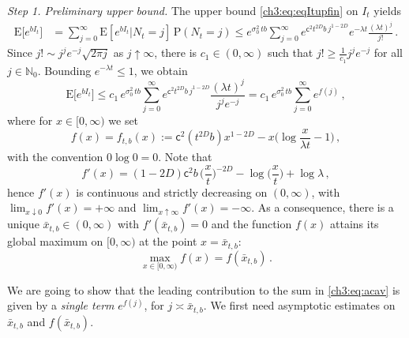 \documentclass[a4paper,reqno,11pt]{amsart}
\numberwithin{equation}{section}
\newcommand{\N}{\mathbb{N}}
\newcommand{\PEfont}{\mathrm}
\renewcommand{\P}{\ensuremath{\PEfont P}}
\newcommand{\E}{\ensuremath{\PEfont E}}
\newcommand\sfc{\mathsf{c}}
\begin{document}
\medskip
\noindent
\emph{Step 1. Preliminary upper bound.}
The upper bound \eqref{ch3:eq:eqItupfin} on $I_t$ yields
\begin{equation*}
\begin{split}
 \E\big[e^{bI_t}\big] &= 
 \sum_{j=0}^{\infty}
 \E[e^{bI_t}|N_t=j ] \, \P (N_t=j) \le
e^{\sigma_0^2 \, t b} \sum_{j=0}^{\infty} 
e^{\sfc^2 t^{2D} b \, j^{1-2D}}
 e^{-\lambda t}\frac{(\lambda t)^j}{j!} \,.
\end{split}
\end{equation*}
Since $j! \sim j^j e^{-j} \sqrt{2\pi j}$ as $j\uparrow \infty$,
there is $c_1 \in (0,\infty)$ such that $j! \ge \frac{1}{c_1}
j^j e^{-j}$ for all $j\in\N_0$. Bounding $e^{-\lambda t} \le 1$, we obtain
\begin{equation}\label{ch3:eq:acav}
	\E\big[e^{bI_t}\big] \le
	c_1 \, e^{\sigma_0^2 \, t b} \sum_{j=0}^{\infty} 
	e^{\sfc^2 t^{2D} b \, j^{1-2D}}
	\frac{(\lambda t)^j}{j^j e^{-j}} 
	= c_1 \, e^{\sigma_0^2 \, t b} \sum_{j=0}^{\infty} 
	e^{f(j)} \,,
\end{equation}
where for $x \in [0,\infty)$ we set
\begin{equation}\label{ch3:eq: eqdefnf}
	f(x)= f_{t,b}(x) := \sfc^2 \left(t^{2D}b\right) x^{1-2D} - x \bigg( \log \frac{x}{\lambda t} - 1 \bigg) \,,
\end{equation}
with the convention $0\log 0=0$. Note that
\begin{equation} \label{ch3:eq:f'}
	f'(x) = (1-2D) \sfc^2 b \, \bigg( \frac{x}{t} \bigg)^{-2D} 
	- \log \bigg(\frac{x}{t}\bigg) + \log \lambda \,,
\end{equation}
hence $f'(x)$ is continuous and strictly decreasing on $(0,\infty)$, with 
$\lim_{x \downarrow 0} f'(x) = +\infty$ and
$\lim_{x \uparrow \infty }f'(x) = -\infty$. As a consequence, there is a unique
$\bar x_{t,b} \in (0,\infty)$ with $f'(\bar x_{t,b}) = 0$ and the function $f(x)$ attains
its global maximum on $[0,\infty)$ at the point $x=\bar x_{t,b}$:
\begin{equation}\label{ch3:eq:maxf}
	\max_{x\in [0,\infty)} f(x) = f(\bar x_{t,b}) \,.
\end{equation}

We are going to show that 
the leading contribution to the sum in \eqref{ch3:eq:acav}
is given by a \emph{single term} $e^{f(j)}$, for $j \asymp \bar x_{t,b}$.
We first need asymptotic estimates on $\bar x_{t,b}$ and $f(\bar x_{t,b})$.
\end{document}
